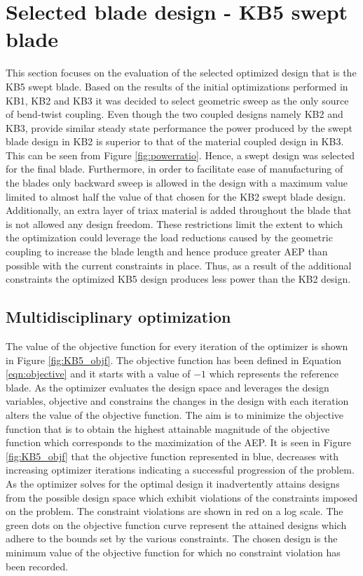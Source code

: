 \section{Selected blade design - KB5 swept blade}
\label{sec:final_design}
This section focuses on the evaluation of the selected optimized design that is the KB5 swept blade. Based on the results of the initial optimizations performed in KB1, KB2 and KB3 it was decided to select geometric sweep as the only source of bend-twist coupling. Even though the two coupled designs namely KB2 and KB3, provide similar steady state performance the power produced by the swept blade design in KB2 is superior to that of the material coupled design in KB3. This can be seen from Figure \ref{fig:powerratio}. Hence, a swept design was selected for the final blade. Furthermore, in order to facilitate ease of manufacturing of the blades only backward sweep is allowed in the design with a maximum value limited to almost half the value of that chosen for the KB2 swept blade design. Additionally, an extra layer of triax material is added throughout the blade that is not allowed any design freedom. These restrictions limit the extent to which the optimization could leverage the load reductions caused by the geometric coupling to increase the blade length and hence produce greater AEP than possible with the current constraints in place. Thus, as a result of the additional constraints the optimized KB5 design produces less power than the KB2 design.

\subsection{Multidisciplinary optimization}
\label{subsec:MDO}
The value of the objective function for every iteration of the optimizer is shown in Figure \ref{fig:KB5_objf}. The objective function has been defined in Equation \ref{eqn:objective} and it starts with a value of $-1$ which represents the reference blade. As the optimizer evaluates the design space and leverages the design variables, objective and constrains the changes in the design with each iteration alters the value of the objective function. The aim is to minimize the objective function that is to obtain the highest attainable magnitude of the objective function which corresponds to the maximization of the AEP. It is seen in Figure \ref{fig:KB5_objf} that the objective function represented in blue, decreases with increasing optimizer iterations indicating a successful progression of the problem. As the optimizer solves for the optimal design it inadvertently attains designs from the possible design space which exhibit violations of the constraints imposed on the problem. The constraint violations are shown in red on a log scale. The green dots on the objective function curve represent the attained designs which adhere to the bounds set by the various constraints. The chosen design is the minimum value of the objective function for which no constraint violation has been recorded.

